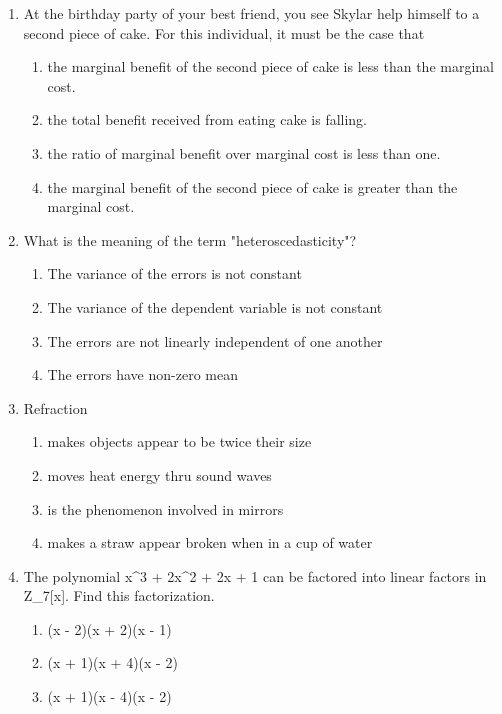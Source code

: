 \documentclass[12pt]{article}
\begin{document}
\begin{enumerate}[label=\arabic*.]
\begin{enumerate}[label=(\alph*)]
    \item space for its low gravity
    \item a desert for its high temperatures
\end{enumerate}
\item At the birthday party of your best friend, you see Skylar help himself to a second piece of cake. For this individual, it must be the case that
\begin{enumerate}[label=(\alph*)]
    \item the marginal benefit of the second piece of cake is less than the marginal cost.
    \item the total benefit received from eating cake is falling.
    \item the ratio of marginal benefit over marginal cost is less than one.
    \item the marginal benefit of the second piece of cake is greater than the marginal cost.
\end{enumerate}
\item What is the meaning of the term "heteroscedasticity"?
\begin{enumerate}[label=(\alph*)]
    \item The variance of the errors is not constant
    \item The variance of the dependent variable is not constant
    \item The errors are not linearly independent of one another
    \item The errors have non-zero mean
\end{enumerate}
\item Refraction
\begin{enumerate}[label=(\alph*)]
    \item makes objects appear to be twice their size
    \item moves heat energy thru sound waves
    \item is the phenomenon involved in mirrors
    \item makes a straw appear broken when in a cup of water
\end{enumerate}
\item The polynomial x\^{}3 + 2x\^{}2 + 2x + 1 can be factored into linear factors in Z\_7[x]. Find this factorization.
\begin{enumerate}[label=(\alph*)]
    \item (x - 2)(x + 2)(x - 1)
    \item (x + 1)(x + 4)(x - 2)
    \item (x + 1)(x - 4)(x - 2)

\end{enumerate}
\end{enumerate}
\end{document}
